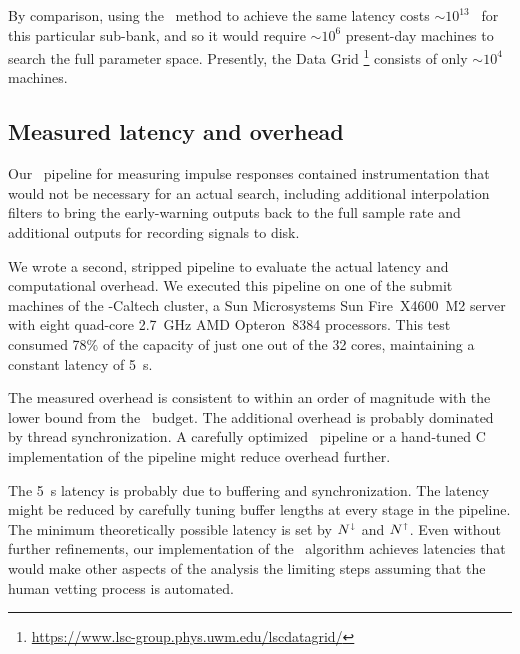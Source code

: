 By comparison, using the \TD\ method to achieve the same latency costs
$\sim$$10^{13}$ \flops\ for this particular sub-bank, and so it would require
$\sim$$10^6$ present-day machines to search the full parameter space.
Presently, the \LIGO{} Data Grid%
\footnote{\url{https://www.lsc-group.phys.uwm.edu/lscdatagrid/}} consists of
only $\sim$$10^4$ machines.

\subsection{Measured latency and overhead}

Our \gstreamer\ pipeline for measuring impulse responses contained
instrumentation that would not be necessary for an actual search, including
additional interpolation filters to bring the early-warning outputs back to the
full sample rate and additional outputs for recording signals to disk.

We wrote a second, stripped pipeline to evaluate the actual latency and
computational overhead.  We executed this pipeline on one of the submit
machines of the \LIGO-Caltech cluster, a Sun Microsystems Sun
Fire\texttrademark\ X4600~M2 server with eight quad-core 2.7~GHz AMD
Opteron\texttrademark\ 8384 processors.  This test consumed 78\% of the
capacity of just one out of the 32 cores, maintaining a constant latency of
5~s.

The measured overhead is consistent to within an order of magnitude with the
lower bound from the \flops\ budget.  The additional overhead is probably
dominated by thread synchronization.  A carefully optimized \gstreamer\
pipeline or a hand-tuned C implementation of the pipeline might reduce overhead
further.

The 5~s latency is probably due to buffering and synchronization.  The latency
might be reduced by carefully tuning buffer lengths at every stage in
the pipeline.  The minimum theoretically possible latency is set by
$N^\shortdownarrow$ and $N^\shortuparrow$.
Even without further refinements, our implementation of the \lloid\ algorithm
achieves latencies that would make other aspects of the analysis the limiting
steps assuming that the human vetting process is automated.  
